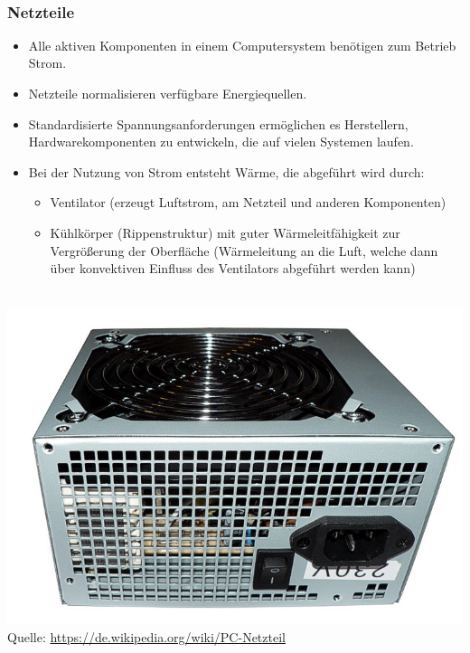 ~\\
\begin{minipage}[t]{0.7\textwidth}
	\subsubsection{Netzteile}
	\begin{itemize}
		\item Alle aktiven Komponenten in einem Computersystem benötigen zum Betrieb Strom.
		\item Netzteile normalisieren verfügbare Energiequellen.
		\item Standardisierte Spannungsanforderungen ermöglichen es Herstellern, Hardwarekomponenten zu entwickeln, die auf vielen Systemen laufen.
		\item Bei der Nutzung von Strom entsteht Wärme, die abgeführt wird durch:
		\begin{itemize}
			\item Ventilator (erzeugt Luftstrom, am Netzteil und anderen Komponenten)
			\item Kühlkörper (Rippenstruktur) mit guter Wärmeleitfähigkeit zur Vergrößerung der Oberfläche (Wärmeleitung an die Luft, welche dann über konvektiven Einfluss des Ventilators abgeführt werden kann)
		\end{itemize}
	\end{itemize}
\end{minipage}
\begin{minipage}[t]{0.3\textwidth}
	\centering
	~\\
	\includegraphics[width=1\linewidth]{./media/netzteil}\\
	\tiny
	Quelle: \url{https://de.wikipedia.org/wiki/PC-Netzteil}
\end{minipage}

